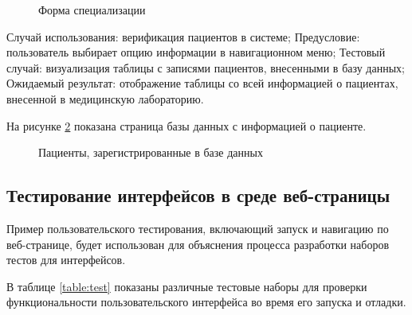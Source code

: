 \begin{figure}
	\caption{Форма специализации}
	\label{image:ana}
\end{figure}

Случай использования: верификация пациентов в системе;
Предусловие: пользователь выбирает опцию информации в навигационном меню;
Тестовый случай: визуализация таблицы с записями пациентов, внесенными в базу данных;
Ожидаемый результат: отображение таблицы со всей информацией о пациентах, внесенной в медицинскую лабораторию.

На рисунке \ref{image:infor} показана страница базы данных с информацией о пациенте.

\begin{figure}
	\caption{Пациенты, зарегистрированные в базе данных}
	\label{image:infor}
\end{figure}

\subsection{Тестирование интерфейсов в среде веб-страницы}

Пример пользовательского тестирования, включающий запуск и навигацию по веб-странице, будет использован для объяснения процесса разработки наборов тестов для интерфейсов.

В таблице \ref{table:test} показаны различные тестовые наборы для проверки функциональности пользовательского интерфейса во время его запуска и отладки.

